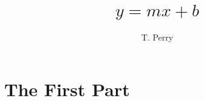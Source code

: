 \documentclass[12pt]{book}
\title{$y=mx+b$} %
\author{T. Perry} %
\begin{document}






%








\part{The First Part}









\end{document}
